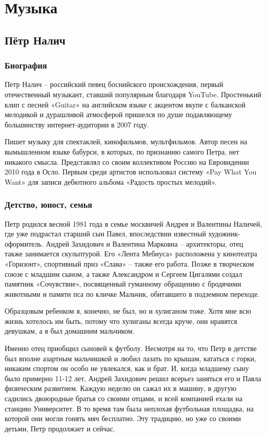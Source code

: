 \chapter{Музыка}


\section{Пётр Налич}
\subsection{Биография}
Петр Налич – российский певец боснийского происхождения, первый отечественный музыкант, ставший популярным благодаря YouTube. Простенький клип с песней «Guitar» на английском языке с акцентом вкупе с балканской мелодикой и дурашливой атмосферой пришелся по душе подавляющему большинству интернет-аудитории в 2007 году.

Пишет музыку для спектаклей, кинофильмов, мультфильмов. Автор песен на вымышленном языке бабурси, в которых, по признанию самого Петра, нет никакого смысла. Представлял со своим коллективом Россию на Евровидении 2010 года в Осло. Первым среди артистов использовал систему «Pay What You Want» для записи дебютного альбома «Радость простых мелодий».

\subsection{Детство, юност, семья}
Петр родился весной 1981 года в семье москвичей Андрея и Валентины Наличей, где уже подрастал старший сын Павел, впоследствии известный художник-оформитель. Андрей Захидович и Валентина Марковна – архитекторы, отец также занимается скульптурой. Его «Лента Мебиуса» расположена у кинотеатра «Горизонт», спортивный приз «Слава» – также его работа. Позже в творческом союзе с младшим сыном, а также Александром и Сергеем Цигалями создал памятник «Сочувствие», посвященный гуманному обращению с бродячими животными и памяти пса по кличке Мальчик, обитавшего в подземном переходе.

\begin{fancyquotes}
    Образцовым ребенком я, конечно, не был, но и хулиганом тоже. Хотя мне всю жизнь хотелось им быть, потому что хулиганы всегда круче, они нравятся девушкам, а я был домашним мальчиком.
\end{fancyquotes}

Именно отец приобщил сыновей к футболу. Несмотря на то, что Петр в детстве был вполне азартным мальчишкой и любил лазать по крышам, кататься с горки, никаким спортом он особо не увлекался, как и брат. И, когда младшему сыну было примерно 11-12 лет, Андрей Захидович решил всерьез заняться его и Павла физическим развитием. Каждую неделю он сажал их в машину, в другую садились двоюродные братья со своими отцами, и всей компанией ехали на станцию Университет. В то время там была неплохая футбольная площадка, на которой они могли гонять мяч бесплатно. Эту традицию, но уже со своими детьми, Петр продолжает и сейчас.

